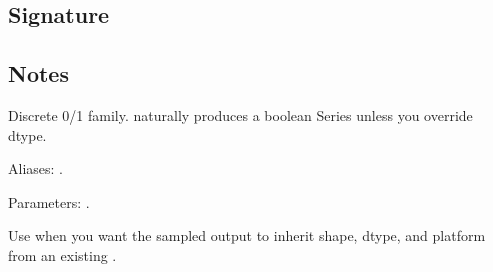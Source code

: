 \documentclass[letterpaper,10pt,english]{sphinxmanual}
\begin{document}
\subsection{Signature}
\label{\detokenize{distribution_catalog:id10}}
\begin{sphinxVerbatim}[commandchars=\\\{\}]
\end{sphinxVerbatim}


\subsection{Notes}
\label{\detokenize{distribution_catalog:id11}}
\sphinxAtStartPar
Discrete 0/1 family.  naturally produces a boolean Series unless you override dtype.

\sphinxAtStartPar
Aliases: .

\sphinxAtStartPar
Parameters: .

\sphinxAtStartPar
Use  when you want the sampled output to inherit shape, dtype, and platform from an existing .
\end{document}
